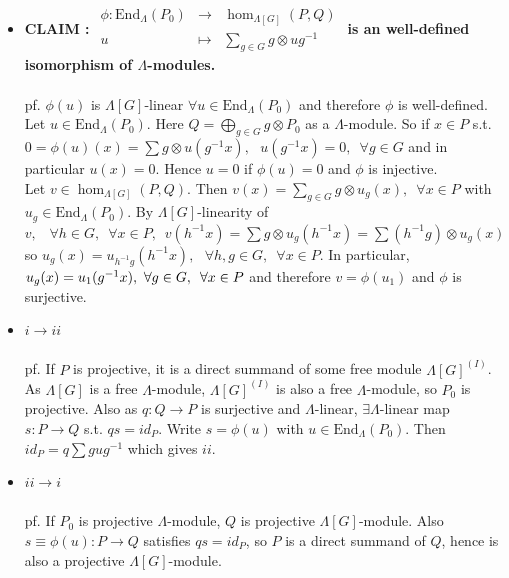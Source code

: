 \documentclass[12pt,letterpaper]{report}
\begin{document}
\begin{itemize}
\item \textbf{CLAIM : $\begin{array}{rrr}\phi:\text{End}_{\Lambda}(P_{0})&\rightarrow&\hom_{\Lambda[G]}(P,Q)\\u&\mapsto&\sum_{g\in G}g\otimes ug^{-1}\end{array}$ is an well-defined isomorphism of $\Lambda$-modules.}
\\\\pf. $\phi(u)$ is $\Lambda[G]$-linear $\forall u\in \text{End}_{\Lambda}(P_{0})$ and therefore $\phi$ is well-defined.
\\Let $u\in \text{End}_{\Lambda}(P_{0})$. Here $Q=\bigoplus_{g\in G}g\otimes P_{0}$ as a $\Lambda$-module. So if $x\in P$ s.t. $0=\phi(u)(x)=\sum g\otimes u(g^{-1}x),\,\,\,\,u(g^{-1}x)=0,\,\,\,\forall g\in G$ and in particular $u(x)=0$. Hence $u=0$ if $\phi(u)=0$ and $\phi$ is injective. 
\\Let $v\in\hom_{\Lambda[G]}(P,Q)$. Then $v(x)=\sum_{g\in G}g\otimes u_{g}(x),\,\,\,\forall x\in P$ with $u_{g}\in \text{End}_{\Lambda}(P_{0})$. By $\Lambda[G]$-linearity of $v,\,\,\,\,\,\forall h\in G,\,\,\,\forall x\in P,\,\,\,v(h^{-1}x)=\sum g\otimes u_{g}(h^{-1}x)=\sum (h^{-1}g)\otimes u_{g}(x)$ so $u_{g}(x)=u_{h^{-1}g}(h^{-1}x),\,\,\,\,\forall h,g\in G,\,\,\,\forall x\in P$. In particular, $u_{g}(x)=u_{1}(g^{-1}x),\,\,\,\\\forall g\in G,\,\,\,\forall x\in P$ and therefore $v=\phi(u_{1})$ and $\phi$ is surjective.

\item $i\rightarrow ii$
\\\\pf. If $P$ is projective, it is a direct summand of some free module $\Lambda[G]^{(I)}$. As $\Lambda[G]$ is a free $\Lambda$-module, $\Lambda[G]^{(I)}$ is also a free $\Lambda$-module, so $P_{0}$ is projective. Also as $q:Q\rightarrow P$ is surjective and $\Lambda$-linear, $\exists \Lambda$-linear map $s:P\rightarrow Q$ s.t. $qs=id_{P}$. Write $s=\phi(u)$ with $u\in\text{End}_{\Lambda}(P_{0})$. Then $id_{P}=q\sum gug^{-1}$ which gives $ii$.

\item $ii\rightarrow i$
\\\\pf. If $P_{0}$ is projective $\Lambda$-module, $Q$ is projective $\Lambda[G]$-module. Also $s\equiv\phi(u):P\rightarrow Q$ satisfies $qs=id_{P}$, so $P$ is a direct summand of $Q$, hence is also a projective $\Lambda[G]$-module.

\end{itemize}
\end{document}
